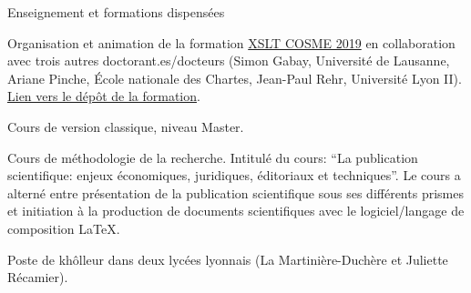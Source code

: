 










\begin{rubric}{Enseignement et formations dispensées}
                                \entry*[2018-2019]
                                
                            Organisation et animation
                de la formation \href{https://cosme.hypotheses.org/1117}{XSLT COSME 2019} en collaboration avec trois autres
                doctorant.es/docteurs (Simon Gabay, Université de Lausanne,
                Ariane Pinche, École nationale des Chartes, Jean-Paul Rehr,
                Université Lyon II). \href{https://github.com/gabays/Cours\_COSME\_2019}{Lien vers le
                dépôt de la formation}.
                    
                                \entry*
                            Cours de
                version classique, niveau Master.
                    
                                \entry*
                            Cours de méthodologie de la recherche. Intitulé du
                cours: \enquote{La publication scientifique: enjeux économiques,
                juridiques, éditoriaux et techniques}. Le cours a alterné
                entre présentation de la publication scientifique sous ses
                différents prismes et initiation à la production de documents
                scientifiques avec le logiciel/langage de composition
                \LaTeX.
                    
                                \entry*[2017-2018]
                                
                            Poste de khôlleur dans deux lycées lyonnais (La
                        Martinière-Duchère et Juliette Récamier).
                    \end{rubric}


